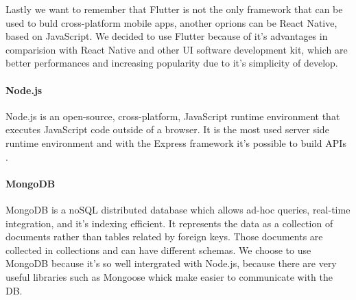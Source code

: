 Lastly we want to remember that Flutter is not the only framework that can be used to buld cross-platform mobile apps, another oprions can be React Native, based on JavaScript.
We decided to use Flutter because of it's advantages in comparision with React Native and other UI software development kit, which are better performances and increasing popularity due to it's simplicity of develop.

\paragraph{Node.js}
Node.js is an open-source, cross-platform, JavaScript runtime environment that executes JavaScript code outside of a browser. It is the most used server side runtime environment and with the Express framework it's possible to build APIs .


\paragraph{MongoDB}
MongoDB is a noSQL distributed database which allows ad-hoc queries, real-time integration, and it's indexing efficient. It represents the data as a collection of documents rather than tables related by foreign keys. Those documents are collected in collections and can have different schemas. We choose to use MongoDB because it's so well intergrated with Node.js, because there are very useful libraries such as Mongoose whick make easier to communicate with the DB.

